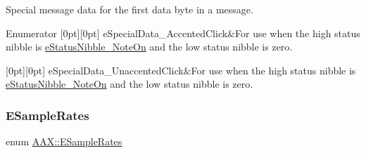 Special message data for the first data byte in a message. 

\begin{DoxyEnumFields}{Enumerator}
[0pt][0pt]{}\mbox{\label{a00852_a6884ba464f3e76eb758d45daf1395199a52061b5587075953631c1389016cb0cf}} 
e\+Special\+Data\+\_\+\+Accented\+Click&For use when the high status nibble is \mbox{\hyperlink{a00852_a128e460fdb72f04a5d077f77c02b3c30ab269085f7106b0ba07ffaab0b7e6a713}{e\+Status\+Nibble\+\_\+\+Note\+On}} and the low status nibble is zero. \\
\hline

[0pt][0pt]{}\mbox{\label{a00852_a6884ba464f3e76eb758d45daf1395199a35a276fca410721fc1c39adb01be7af3}} 
e\+Special\+Data\+\_\+\+Unaccented\+Click&For use when the high status nibble is \mbox{\hyperlink{a00852_a128e460fdb72f04a5d077f77c02b3c30ab269085f7106b0ba07ffaab0b7e6a713}{e\+Status\+Nibble\+\_\+\+Note\+On}} and the low status nibble is zero. \\
\hline

\end{DoxyEnumFields}
\mbox{\label{a00852_a60daf5874c02a01d2af8c582c0643e2d}} 
\subsubsection{\texorpdfstring{ESampleRates}{ESampleRates}}
{\footnotesize\ttfamily enum \mbox{\hyperlink{a00852_a60daf5874c02a01d2af8c582c0643e2d}{A\+A\+X\+::\+E\+Sample\+Rates}}}

